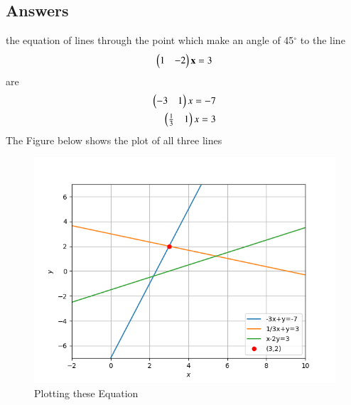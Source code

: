 \documentclass[journal,12pt,twocolumn]{IEEEtran}
\begin{document}
\subsection{Answers}
the equation of lines through the point   which make an angle of 45$^{\circ}$ to the line
\begin{align}
\begin{pmatrix}1 & -2\end{pmatrix}\mathbf{x} = 3 
\end{align}
are
\begin{align}
   \begin{pmatrix}-3 & 1\end{pmatrix}x=-7\\ 
   \begin{pmatrix}\frac{1}{3} & 1\end{pmatrix}x=3
\end{align}
The Figure below shows the plot of all three lines
\begin{figure}[!ht]
\centering
\includegraphics[width=\columnwidth]{Edit_plot.png}
\caption{Plotting these Equation}
\end{figure}
\end{document}
